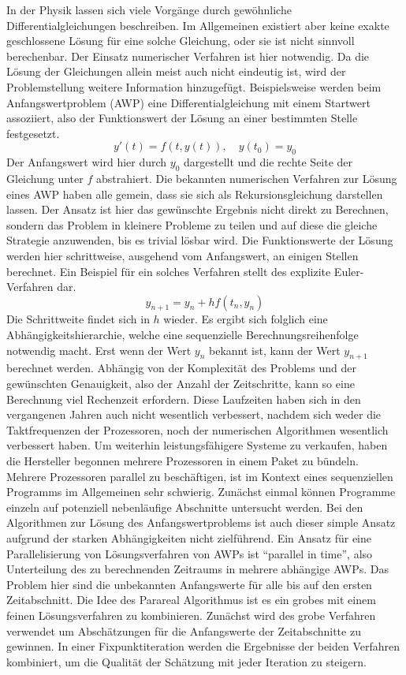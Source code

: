 In der Physik lassen sich viele Vorgänge durch gewöhnliche Differentialgleichungen beschreiben. Im Allgemeinen existiert aber keine exakte geschlossene Lösung für eine solche Gleichung, oder sie ist nicht sinnvoll berechenbar. Der Einsatz numerischer Verfahren ist hier notwendig. Da die Lösung der Gleichungen allein meist auch nicht eindeutig ist, wird der Problemstellung weitere Information hinzugefügt. Beispielsweise werden beim Anfangswertproblem (AWP) eine Differentialgleichung mit einem Startwert assoziiert, also der Funktionswert der Lösung an einer bestimmten Stelle festgesetzt.
\begin{displaymath}
    y'(t) = f(t,y(t)), \quad y(t_0) = y_0
\end{displaymath}
Der Anfangswert wird hier durch \(y_0\) dargestellt und die rechte Seite der Gleichung unter \(f\) abstrahiert. Die bekannten numerischen Verfahren zur Lösung eines AWP haben alle gemein, dass sie sich als Rekursionsgleichung darstellen lassen. Der Ansatz ist hier das gewünschte Ergebnis nicht direkt zu Berechnen, sondern das Problem in kleinere Probleme zu teilen und auf diese die gleiche Strategie anzuwenden, bis es trivial lösbar wird. Die Funktionswerte der Lösung werden hier schrittweise, ausgehend vom Anfangswert, an einigen Stellen berechnet. Ein Beispiel für ein solches Verfahren stellt des explizite Euler-Verfahren dar.
\begin{displaymath}
    y_{n+1} = y_n + hf(t_n,y_n)
\end{displaymath}
Die Schrittweite findet sich in \(h\) wieder. Es ergibt sich folglich eine Abhängig\-keits\-hierarchie, welche eine sequenzielle Berechnungsreihenfolge notwendig macht. Erst wenn der Wert \(y_n\) bekannt ist, kann der Wert \(y_{n+1}\) berechnet werden. Abhängig von der Komplexität des Problems und der gewünschten Genauigkeit, also der Anzahl der Zeitschritte, kann so eine Berechnung viel Rechenzeit erfordern. Diese Laufzeiten haben sich in den vergangenen Jahren auch nicht wesentlich verbessert, nachdem sich weder die Taktfrequenzen der Prozessoren, noch der numerischen Algorithmen wesentlich verbessert haben. Um weiterhin leistungsfähigere Systeme zu verkaufen, haben die Hersteller begonnen mehrere Prozessoren in einem Paket zu bündeln.\\

Mehrere Prozessoren parallel zu beschäftigen, ist im Kontext eines sequenziellen Programms im Allgemeinen sehr schwierig. Zunächst einmal können Programme einzeln auf potenziell nebenläufige Abschnitte untersucht werden. Bei den Algorithmen zur Lösung des Anfangswertproblems ist auch dieser simple Ansatz aufgrund der starken Abhängigkeiten nicht zielführend. Ein Ansatz für eine Parallelisierung von Lösungsverfahren von AWPs ist "`parallel in time"', also Unterteilung des zu berechnenden Zeitraums in mehrere abhängige AWPs. Das Problem hier sind die unbekannten Anfangswerte für alle bis auf den ersten Zeitabschnitt. Die Idee des Parareal Algorithmus ist es ein grobes mit einem feinen Lösungsverfahren zu kombinieren. Zunächst wird des grobe Verfahren verwendet um Abschätzungen für die Anfangswerte der Zeitabschnitte zu gewinnen. In einer Fixpunktiteration werden die Ergebnisse der beiden Verfahren kombiniert, um die Qualität der Schätzung mit jeder Iteration zu steigern.
